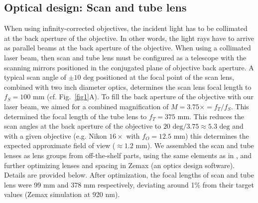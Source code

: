 \documentclass[10pt,letterpaper]{article}
\begin{document}
\subsection*{Optical design: Scan and tube lens}
When using infinity-corrected objectives, the incident light has to be collimated at the back aperture of the objective. In other words, the light rays have to arrive as parallel beams at the back aperture of the objective. When using a collimated laser beam, then scan and tube lens must be configured as a telescope with the scanning mirrors positioned in the conjugated plane of objective back aperture. A typical scan angle of $\pm10\text{ deg}$ positioned at the focal point of the scan lens, combined with two inch diameter optics, determines the scan lens focal length to $f_S=100\text{ mm}$ (cf. Fig.~\ref{fig1}A). To fill the back aperture of the objective with our laser beam, we aimed for a combined magnification of $M=3.75\times=f_T/f_S$. This determined the focal length of the tube lens to $f_T=375\text{ mm}$. This reduces the scan angles at the back aperture of the objective to $20\text{ deg}/3.75\approx 5.3\text{ deg}$ and with a given objective (e.g. Nikon $16\times$ with $f_O=12.5\text{ mm}$) this determines the expected approximate field of view ($\approx 1.2\text{ mm}$).\newline
We assembled the scan and tube lenses as lens groups from off-the-shelf parts, using the same elements as in \cite{Yao2023}, and further optimizing lenses and spacing in Zemax (an optics design software). Details are provided below. After optimization, the focal lengths of scan and tube lens were 99 mm and 378 mm respectively, deviating around 1\% from their target values (Zemax simulation at 920 nm).
%
\end{document}
